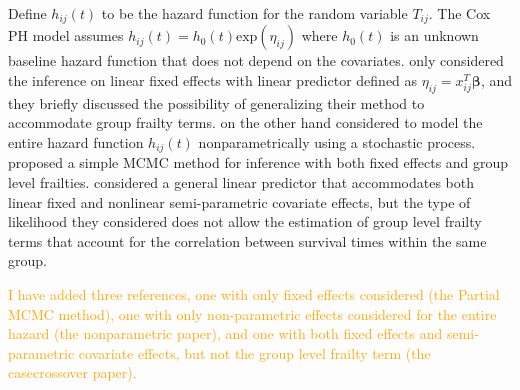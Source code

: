 \documentclass[ba]{imsart}
\newcommand{\ziang}[1]{\textcolor{orange}{{ }#1}}
\begin{document}
Define $h_{ij}(t)$ to be the hazard function for the random variable $T_{ij}$. The Cox PH model assumes $h_{ij}(t) = h_0(t)\text{exp}(\eta_{ij})$ where $h_0(t)$ is an unknown baseline hazard function that does not depend on the covariates. \cite{BayesianPartialMCMC} only considered the inference on linear fixed effects with linear predictor defined as $\eta_{ij} = x_{ij}^T \boldsymbol{\beta}$, and they briefly discussed the possibility of generalizing their method to accommodate group frailty terms. \cite{PartialandFull1} on the other hand considered to model the entire hazard function $h_{ij}(t)$ nonparametrically using a stochastic process. \cite{PartialandFull2} proposed a simple MCMC method for inference with both fixed effects and group level frailties. \cite{casecross} considered a general linear predictor that accommodates both linear fixed and nonlinear semi-parametric covariate effects, but the type of likelihood they considered does not allow the estimation of group level frailty terms that account for the correlation between survival times within the same group.

\ziang{I have added three references, one with only fixed effects considered (the Partial MCMC method), one with only non-parametric effects considered for the entire hazard (the nonparametric paper), and one with both fixed effects and semi-parametric covariate effects, but not the group level frailty term (the casecrossover paper).}
\end{document}
